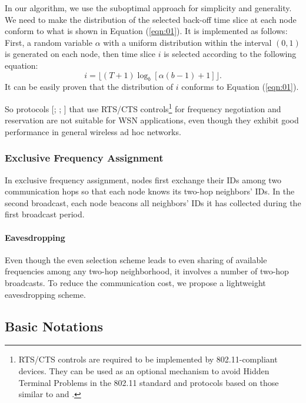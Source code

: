 \documentclass[prodmode,acmtecs]{acmsmall}
\begin{document}
In our algorithm, we use the suboptimal approach for simplicity and
generality. We need to make the distribution of the selected back-off
time slice at each node conform to what is shown in Equation
(\ref{eqn:01}). It is implemented as follows: First, a random
variable $\alpha$ with a uniform distribution within the interval
$(0, 1)$ is generated on each node, then time slice $i$ is selected
according to the following equation:
\[
i=\lfloor(T+1)\log_b[\alpha(b-1)+1]\rfloor.
\]
It can be easily proven that the distribution of $i$ conforms to Equation
(\ref{eqn:01}).

So protocols [;
; ] that use RTS/CTS
controls\footnote{RTS/CTS controls are required to be implemented by
802.11-compliant devices. They can be used as an optional mechanism
to avoid Hidden Terminal Problems in the 802.11 standard and
protocols based on those similar to  and
.} for frequency negotiation and reservation are not
suitable for WSN applications, even though they exhibit good
performance in general wireless ad hoc
networks.

\subsubsection{Exclusive Frequency Assignment}

In exclusive frequency assignment, nodes first exchange their IDs
among two communication hops so that each node knows its two-hop
neighbors' IDs. In the second broadcast, each node beacons all
neighbors' IDs it has collected during the first broadcast period.

\paragraph{Eavesdropping}

Even though the even selection scheme leads to even sharing of
available frequencies among any two-hop neighborhood, it involves a
number of two-hop broadcasts. To reduce the communication cost, we
propose a lightweight eavesdropping scheme.

\subsection{Basic Notations}
\end{document}
